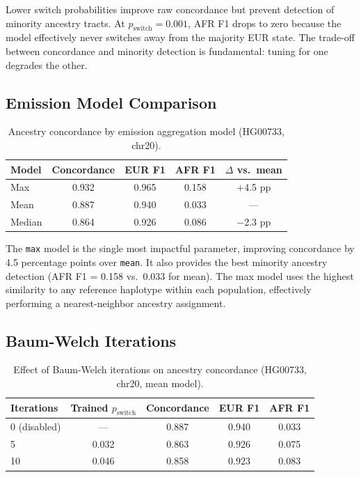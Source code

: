 \documentclass[11pt]{article}
\begin{document}
Lower switch probabilities improve raw concordance but prevent detection of minority ancestry tracts. At $p_{\text{switch}} = 0.001$, AFR F1 drops to zero because the model effectively never switches away from the majority EUR state. The trade-off between concordance and minority detection is fundamental: tuning for one degrades the other.

\subsection{Emission Model Comparison}

\begin{table}[ht]
\centering
\caption{Ancestry concordance by emission aggregation model (HG00733, chr20).}
\label{tab:emission_model_cv}
\begin{tabular}{lcccc}
\hline
\textbf{Model} & \textbf{Concordance} & \textbf{EUR F1} & \textbf{AFR F1} & \textbf{$\Delta$ vs.\ mean} \\
\hline
Max & 0.932 & 0.965 & 0.158 & $+$4.5 pp \\
Mean & 0.887 & 0.940 & 0.033 & --- \\
Median & 0.864 & 0.926 & 0.086 & $-$2.3 pp \\
\hline
\end{tabular}
\end{table}

The \texttt{max} model is the single most impactful parameter, improving concordance by 4.5 percentage points over \texttt{mean}. It also provides the best minority ancestry detection (AFR F1 = 0.158 vs.\ 0.033 for mean). The max model uses the highest similarity to any reference haplotype within each population, effectively performing a nearest-neighbor ancestry assignment.

\subsection{Baum-Welch Iterations}

\begin{table}[ht]
\centering
\caption{Effect of Baum-Welch iterations on ancestry concordance (HG00733, chr20, mean model).}
\label{tab:ancestry_bw_iters}
\begin{tabular}{lcccc}
\hline
\textbf{Iterations} & \textbf{Trained $p_{\text{switch}}$} & \textbf{Concordance} & \textbf{EUR F1} & \textbf{AFR F1} \\
\hline
0 (disabled) & --- & 0.887 & 0.940 & 0.033 \\
5 & 0.032 & 0.863 & 0.926 & 0.075 \\
10 & 0.046 & 0.858 & 0.923 & 0.083 \\
\hline
\end{tabular}
\end{table}
\end{document}
